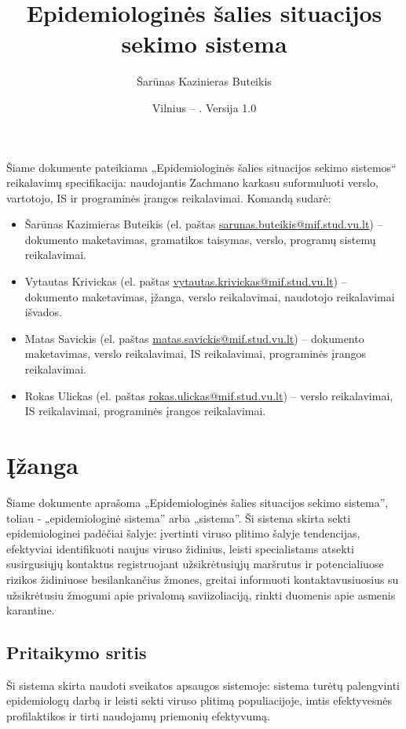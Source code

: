 \documentclass{VUMIFPSkursinis}
\title{Epidemiologinės šalies situacijos sekimo sistema}
\author{Šarūnas Kazinieras Buteikis}
\date{Vilnius – \the\year. Versija 1.0}
\begin{document}
\maketitle


Šiame dokumente pateikiama „Epidemiologinės šalies situacijos sekimo sistemos“ reikalavimų specifikacija: 
naudojantis Zachmano karkasu suformuluoti verslo, vartotojo, IS ir programinės įrangos reikalavimai. Komandą sudarė:
\begin{itemize}
	\item Šarūnas Kazimieras Buteikis (el. paštas \href{mailto:sarunas.buteikis@mif.stud.vu.lt}{sarunas.buteikis@mif.stud.vu.lt}) -- dokumento maketavimas, gramatikos taisymas, verslo, programų sistemų reikalavimai.
	\item Vytautas Krivickas (el. paštas \href{mailto:vytautas.krivickas@mif.stud.vu.lt}{vytautas.krivickas@mif.stud.vu.lt}) -- dokumento maketavimas, įžanga, verslo reikalavimai, naudotojo reikalavimai išvados.
	\item Matas Savickis (el. paštas \href{mailto:matas.savickis@mif.stud.vu.lt}{matas.savickis@mif.stud.vu.lt}) -- dokumento maketavimas, verslo reikalavimai, IS reikalavimai, programinės įrangos reikalavimai.
	\item Rokas Ulickas (el. paštas \href{mailto:rokas.ulickas@mif.stud.vu.lt}{rokas.ulickas@mif.stud.vu.lt}) -- verslo reikalavimai, IS reikalavimai, programinės įrangos reikalavimai.
\end{itemize}

\newpage

\tableofcontents

\section{Įžanga}
Šiame dokumente aprašoma „Epidemiologinės šalies situacijos sekimo sistema”, toliau - „epidemiologinė sistema” arba „sistema”.
Ši sistema skirta sekti epidemiologinei padėčiai šalyje: įvertinti viruso plitimo šalyje tendencijas,
efektyviai identifikuoti naujus viruso židinius, leisti specialistams atsekti susirgusiųjų
kontaktus registruojant užsikrėtusiųjų maršrutus ir potencialiuose rizikos židiniuose
besilankančius žmones, greitai informuoti kontaktavusiuosius su užsikrėtusiu žmogumi
apie privalomą saviizoliaciją, rinkti duomenis apie asmenis karantine.

\subsection{Pritaikymo sritis}
Ši sistema skirta naudoti sveikatos apsaugos sistemoje: sistema turėtų palengvinti
epidemiologų darbą ir leisti sekti viruso plitimą populiacijoje, imtis efektyvesnės
profilaktikos ir tirti naudojamų priemonių efektyvumą.
\end{document}
